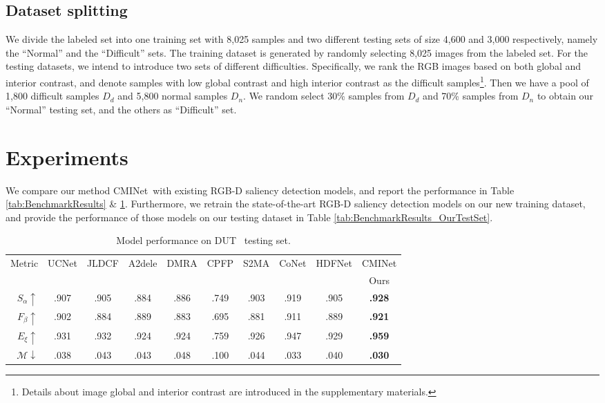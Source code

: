\documentclass[10pt,twocolumn,letterpaper]{article}
\def\ourmodel{CMINet}
\begin{document}
\subsection{Dataset splitting}
We divide the labeled set into one training set with 8,025 samples and two different testing sets of size 4,600 and 3,000 respectively, namely the \enquote{Normal} and the \enquote{Difficult} sets. The training dataset is generated by randomly selecting
8,025 images from the labeled set. For the testing datasets, we intend to introduce two sets of different difficulties. Specifically, we rank the RGB images based on both global and interior contrast, and denote samples with low global contrast and high interior contrast as the difficult samples\footnote{Details about image global and interior contrast are introduced in the supplementary materials.}. Then we have a pool of 1,800 difficult samples $D_d$ and 5,800 normal samples $D_n$. We random select 30\% samples from $D_d$ and 70\% samples from $D_n$ to obtain our \enquote{Normal} testing set,
and the others as \enquote{Difficult} set.

\section{Experiments}
We compare our method
\ourmodel~with existing RGB-D saliency detection models,
and report the performance in Table \ref{tab:BenchmarkResults} \& \ref{tab:BenchmarkResults_DUTRGBD}. Furthermore, we retrain the state-of-the-art RGB-D saliency detection models on our new training dataset, and provide the performance of those models on our testing dataset in Table \ref{tab:BenchmarkResults_OurTestSet}.




\begin{table}[t!]
  \centering
  \scriptsize
  \renewcommand{\arraystretch}{1.0}
  \renewcommand{\tabcolsep}{0.7mm}
\caption{Model performance on DUT~\cite{dmra_iccv19} testing set.}
  \label{tab:BenchmarkResults_DUTRGBD}
  \begin{tabular}{r|cccccccc|c}
  \hline
    Metric & UCNet  & JLDCF &  A2dele & DMRA & CPFP & S2MA & CoNet  & HDFNet & \ourmodel \\    
   & \cite{jing2020uc}          
   & \cite{Fu2020JLDCF}      
   & \cite{A2dele_cvpr2020}
   & \cite{dmra_iccv19}
   & \cite{zhao2019Contrast}  
   & \cite{self_attention_rgbd}  
   & \cite{ji2020accurate} 
   & \cite{HDFNet-ECCV2020} 
   & Ours\\
  \hline
  
$S_{\alpha}\uparrow$   & .907 &  .905 & .884 & .886 & .749 & .903 & .919 & .905  & \textbf{.928}  \\
     $F_{\beta}\uparrow$  & .902 &  .884 & .889 & .883 & .695 & .881 & .911 & .889  & \textbf{.921}  \\
    $E_{\xi}\uparrow$     & .931 &  .932 & .924 & .924 & .759 & .926 & .947 & .929  & \textbf{.959}  \\
    $\mathcal{M}\downarrow$  & .038 &  .043 & .043 & .048 & .100 & .044 & .033 & .040  & \textbf{.030}  \\ \hline
  \end{tabular}
\end{table}
\end{document}

